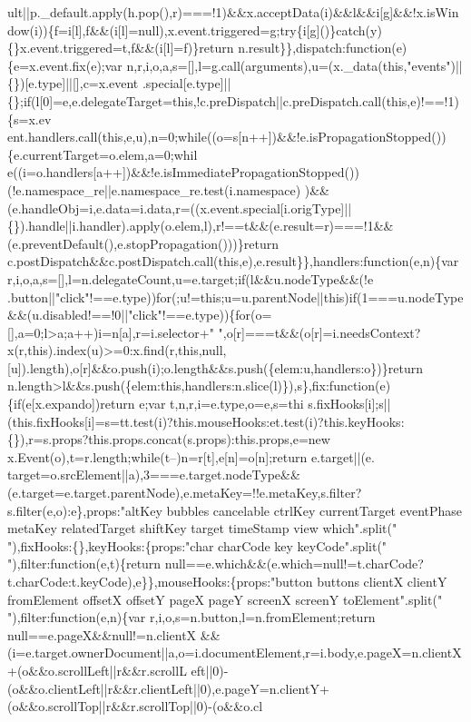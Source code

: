 \begin{DoxyCode}
{      ult||p.\_default.apply(h.pop(),r)===!1)&&x.acceptData(i)&&l&&i[g]&&!x.isWindow(i))\{f=i[l],f&&(i[l]=null),x.event.triggered=g;try\{i[g]()\}catch(y)\{\}x.event.triggered=t,f&&(i[l]=f)\}return
       n.result\}\},dispatch:function(e)\{e=x.event.fix(e);var
       n,r,i,o,a,s=[],l=g.call(arguments),u=(x.\_data(this,"events")||\{\})[e.type]||[],c=x.event
      .special[e.type]||\{\};if(l[0]=e,e.delegateTarget=this,!c.preDispatch||c.preDispatch.call(this,e)!==!1)\{s=x.ev
      ent.handlers.call(this,e,u),n=0;while((o=s[n++])&&!e.isPropagationStopped())\{e.currentTarget=o.elem,a=0;whil
      e((i=o.handlers[a++])&&!e.isImmediatePropagationStopped())(!e.namespace\_re||e.namespace\_re.test(i.namespace)
      )&&(e.handleObj=i,e.data=i.data,r=((x.event.special[i.origType]||\{\}).handle||i.handler).apply(o.elem,l),r!==t&&(e.result=r)===!1&&(e.preventDefault(),e.stopPropagation()))\}return
       c.postDispatch&&c.postDispatch.call(this,e),e.result\}\},handlers:function(e,n)\{var
       r,i,o,a,s=[],l=n.delegateCount,u=e.target;if(l&&u.nodeType&&(!e
      .button||"click"!==e.type))for(;u!=this;u=u.parentNode||this)if(1===u.nodeType&&(u.disabled!==!0||"click"!==e.type))\{for(o=[],a=0;l>a;a++)i=n[a],r=i.selector+"
       ",o[r]===t&&(o[r]=i.needsContext?x(r,this).index(u)>=0:x.find(r,this,null,[u]).length),o[r]&&o.push(i);o.length&&s.push(\{elem:u,handlers:o\})\}return
       n.length>l&&s.push(\{elem:this,handlers:n.slice(l)\}),s\},fix:function(e)\{if(e[x.expando])return e;var
       t,n,r,i=e.type,o=e,s=thi
      s.fixHooks[i];s||(this.fixHooks[i]=s=tt.test(i)?this.mouseHooks:et.test(i)?this.keyHooks:\{\}),r=s.props?this.props.concat(s.props):this.props,e=new x.Event(o),t=r.length;while(t--)n=r[t],e[n]=o[n];return
       e.target||(e.
      target=o.srcElement||a),3===e.target.nodeType&&(e.target=e.target.parentNode),e.metaKey=!!e.metaKey,s.filter?s.filter(e,o):e\},props:"altKey bubbles cancelable ctrlKey currentTarget eventPhase metaKey relatedTarget
       shiftKey target timeStamp view which".split(" "),fixHooks:\{\},keyHooks:\{props:"char charCode key
       keyCode".split(" "),filter:function(e,t)\{return
       null==e.which&&(e.which=null!=t.charCode?t.charCode:t.keyCode),e\}\},mouseHooks:\{props:"button buttons clientX clientY fromElement offsetX offsetY pageX pageY screenX screenY
       toElement".split(" "),filter:function(e,n)\{var r,i,o,s=n.button,l=n.fromElement;return
       null==e.pageX&&null!=n.clientX
      &&(i=e.target.ownerDocument||a,o=i.documentElement,r=i.body,e.pageX=n.clientX+(o&&o.scrollLeft||r&&r.scrollL
      eft||0)-(o&&o.clientLeft||r&&r.clientLeft||0),e.pageY=n.clientY+(o&&o.scrollTop||r&&r.scrollTop||0)-(o&&o.cl
}
\end{DoxyCode}
